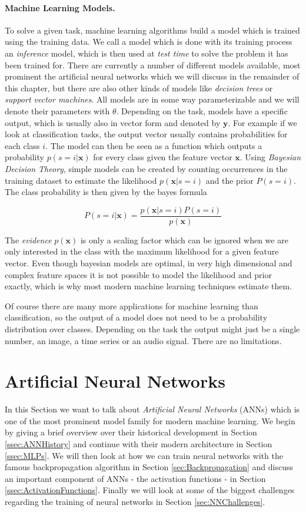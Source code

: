 \paragraph{Machine Learning Models.}
To solve a given task, machine learning algorithms build a model which is trained using the training data. We call a model which is done with its training process an \textit{inference} model, which is then used at \textit{test time} to solve the problem it has been trained for. There are currently a number of different models available, most prominent the artificial neural networks which we will discuss in the remainder of this chapter, but there are also other kinds of models like \textit{decision trees} or \textit{support vector machines}. All models are in some way parameterizable and we will denote their parameters with $\theta$. Depending on the task, models have a specific output, which is usually also in vector form and denoted by $\mathbf{y}$. For example if we look at classification tasks, the output vector usually contains probabilities for each class $i$. The model can then be seen as a function which outputs a probability $p(s = i| \mathbf{x})$ for every class given the feature vector $\mathbf{x}$. Using \textit{Bayesian Decision Theory}, simple models can be created by counting occurrences in the training dataset to estimate the likelihood $p(\mathbf{x}|s=i)$ and the prior $P(s=i)$. The class probability is then given by the bayes formula 

\[P(s=i|\mathbf{x}) = \frac{p(\mathbf{x}|s=i)P(s=i)}{p(\mathbf{x})}\]

The \textit{evidence} $p(\mathbf{x})$ is only a scaling factor which can be ignored when we are only interested in the class with the maximum likelihood for a given feature vector. Even though bayesian models are optimal, in very high dimensional and complex feature spaces it is not possible to model the likelihood and prior exactly, which is why most modern machine learning techniques estimate them. 

Of course there are many more applications for machine learning than classification, so the output of a model does not need to be a probability distribution over classes. Depending on the task the output might just be a single number, an image, a time series or an audio signal. There are no limitations.

\section{Artificial Neural Networks} \label{sec:ANNs}
In this Section we want to talk about \textit{Artificial Neural Networks} (ANNs) which is one of the most prominent model family for modern machine learning. We begin by giving a brief overview over their historical development in Section \ref{ssec:ANNHistory} and continue with their modern architecture in Section \ref{ssec:MLPs}. We will then look at how we can train neural networks with the famous backpropagation algorithm in Section \ref{sec:Backpropagation} and discuss an important component of ANNs - the activation functions - in Section \ref{ssec:ActivationFunctions}. Finally we will look at some of the biggest challenges regarding the training of neural networks in Section \ref{sec:NNChallenges}.

